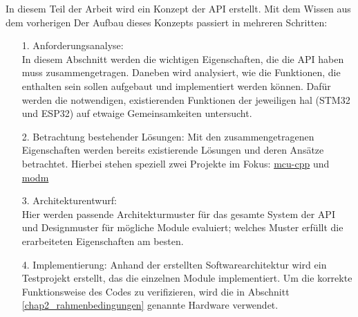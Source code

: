 In diesem Teil der Arbeit wird ein Konzept der API erstellt.
Mit dem Wissen aus dem vorherigen
Der Aufbau dieses Konzepts passiert in mehreren Schritten:
\begin{itemize}
	\item [1.]  Anforderungsanalyse: \\In diesem Abschnitt werden die wichtigen Eigenschaften, die die API haben muss zusammengetragen. Daneben wird analysiert, wie die Funktionen, die enthalten sein sollen aufgebaut und implementiert werden können. Dafür werden die notwendigen, existierenden Funktionen der jeweiligen \gls{hal} (STM32 und ESP32) auf etwaige Gemeinsamkeiten untersucht.
 	\item [2.] 	Betrachtung bestehender Lösungen: Mit den zusammengetragenen Eigenschaften werden bereits existierende Lösungen und deren Ansätze betrachtet. Hierbei stehen speziell zwei Projekte im Fokus: \href{https://github.com/yh-sb/mcu-cpp.git}{mcu-cpp} und \href{https://github.com/modm-io/modm.git}{modm}
	\item [3.] Architekturentwurf: \\Hier werden passende Architekturmuster für das gesamte System der API und Designmuster für mögliche Module evaluiert; welches Muster erfüllt die erarbeiteten Eigenschaften am besten.
	\item [4.] Implementierung: Anhand der erstellten Softwarearchitektur wird ein Testprojekt erstellt, das die einzelnen Module implementiert. Um die korrekte Funktionsweise des Codes zu verifizieren, wird die in Abschnitt \ref{chap2_rahmenbedingungen} genannte Hardware verwendet. 
\end{itemize}


